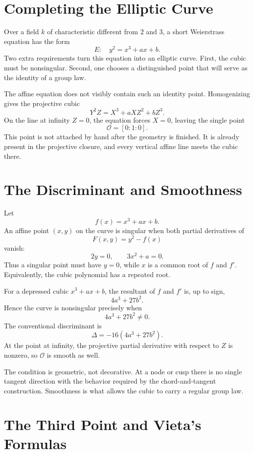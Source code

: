 
\section{Completing the Elliptic Curve}

Over a field \(k\) of characteristic different from \(2\) and \(3\), a short Weierstrass equation has the form
\[
  E:\quad y^2=x^3+ax+b.
\]
Two extra requirements turn this equation into an elliptic curve.  First, the cubic must be nonsingular.  Second, one chooses a distinguished point that will serve as the identity of a group law.

The affine equation does not visibly contain such an identity point.  Homogenizing gives the projective cubic
\[
  Y^2Z=X^3+aXZ^2+bZ^3.
\]
On the line at infinity \(Z=0\), the equation forces \(X=0\), leaving the single point
\[
  \mathcal O=[0:1:0].
\]
This point is not attached by hand after the geometry is finished.  It is already present in the projective closure, and every vertical affine line meets the cubic there.

\section{The Discriminant and Smoothness}

Let
\[
  f(x)=x^3+ax+b.
\]
An affine point \((x,y)\) on the curve is singular when both partial derivatives of
\[
  F(x,y)=y^2-f(x)
\]
vanish:
\[
  2y=0,
  \qquad
  3x^2+a=0.
\]
Thus a singular point must have \(y=0\), while \(x\) is a common root of \(f\) and \(f'\).  Equivalently, the cubic polynomial has a repeated root.

For a depressed cubic \(x^3+ax+b\), the resultant of \(f\) and \(f'\) is, up to sign,
\[
  4a^3+27b^2.
\]
Hence the curve is nonsingular precisely when
\[
  \boxed{4a^3+27b^2\ne0.}
\]
The conventional discriminant is
\[
  \Delta=-16(4a^3+27b^2).
\]
At the point at infinity, the projective partial derivative with respect to \(Z\) is nonzero, so \(\mathcal O\) is smooth as well.

The condition is geometric, not decorative.  At a node or cusp there is no single tangent direction with the behavior required by the chord-and-tangent construction.  Smoothness is what allows the cubic to carry a regular group law.

\section{The Third Point and Vieta's Formulas}

